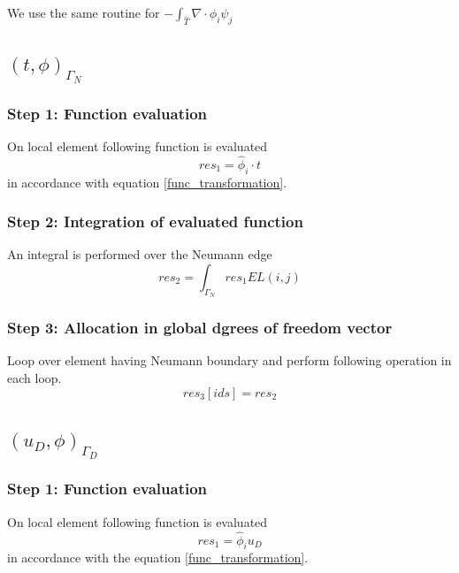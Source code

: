 \documentclass[a4paper]{book}
\begin{document}
We use the same routine for $-\int_{\hat{T}} \nabla \cdot \phi_i \psi_j $

\subsection{$(t,\phi)_{\Gamma_N}$}

\subsubsection{Step 1: Function evaluation}

On local element following function is evaluated 
\begin{equation}
res_1=\hat{\phi}_i \cdot t
\end{equation} in accordance with equation  \ref{func_transformation}.

\subsubsection{Step 2: Integration of evaluated function}

An integral is performed over the Neumann edge 
\begin{equation}
res_2=\int_{\Gamma_N} res_1 EL(i,j)
\end{equation}

\subsubsection{Step 3: Allocation in global dgrees of freedom vector}

Loop over element having Neumann boundary and perform following operation in each loop.
\begin{equation}
res_3[ids]=res_2
\end{equation}

\subsection{$(u_D,\phi)_{\Gamma_D}$}

\subsubsection{Step 1: Function evaluation}

On local element following function is evaluated 
\begin{equation}
res_1=\hat{\phi}_i u_D
\end{equation} 
in accordance with the equation \ref{func_transformation}.
\end{document}
